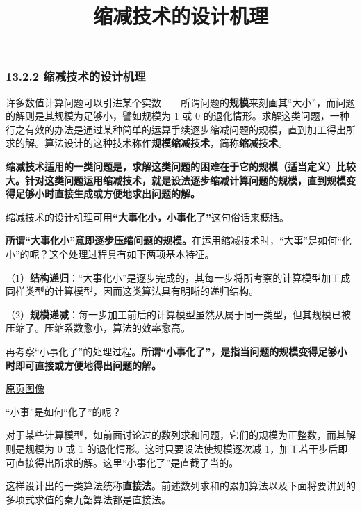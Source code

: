 \documentclass[
  10pt,
  fontset=fandol]{ctexart}
\title{缩减技术的设计机理}
\author{}
\date{}
\begin{document}
\maketitle

\subsubsection{13.2.2 缩减技术的设计机理}\label{ux7f29ux51cfux6280ux672fux7684ux8bbeux8ba1ux673aux7406}

许多数值计算问题可以引进某个实数------所谓问题的\textbf{规模}来刻画其``大小''，而问题的解则是其规模为足够小，譬如规模为 1 或 0 的退化情形。求解这类问题，一种行之有效的办法是通过某种简单的运算手续逐步缩减问题的规模，直到加工得出所求的解。算法设计的这种技术称作\textbf{规模缩减技术}，简称\textbf{缩减技术}。

\textbf{缩减技术适用的一类问题是，求解这类问题的困难在于它的规模（适当定义）比较大。针对这类问题运用缩减技术，就是设法逐步缩减计算问题的规模，直到规模变得足够小时直接生成或方便地求出问题的解。}

缩减技术的设计机理可用\textbf{``大事化小，小事化了''}这句俗话来概括。

\textbf{所谓``大事化小''意即逐步压缩问题的规模。}在运用缩减技术时，``大事''是如何``化小''的呢？这个处理过程具有如下两项基本特征。

（1）\textbf{结构递归}：``大事化小''是逐步完成的，其每一步将所考察的计算模型加工成同样类型的计算模型，因而这类算法具有明晰的递归结构。

（2）\textbf{规模递减}：每一步加工前后的计算模型虽然从属于同一类型，但其规模已被压缩了。压缩系数愈小，算法的效率愈高。

再考察``小事化了''的处理过程。\textbf{所谓``小事化了''，是指当问题的规模变得足够小时即可直接或方便地得出问题的解。}

\href{../../source-images/pdf-310.jpeg}{原页图像}

``小事''是如何``化了''的呢？

对于某些计算模型，如前面讨论过的数列求和问题，它们的规模为正整数，而其解则是规模为 0 或 1 的退化情形。这时只要设法使规模逐次减 1，加工若干步后即可直接得出所求的解。这里``小事化了''是直截了当的。

这样设计出的一类算法统称\textbf{直接法}。前述数列求和的累加算法以及下面将要讲到的多项式求值的秦九韶算法都是直接法。
\end{document}
